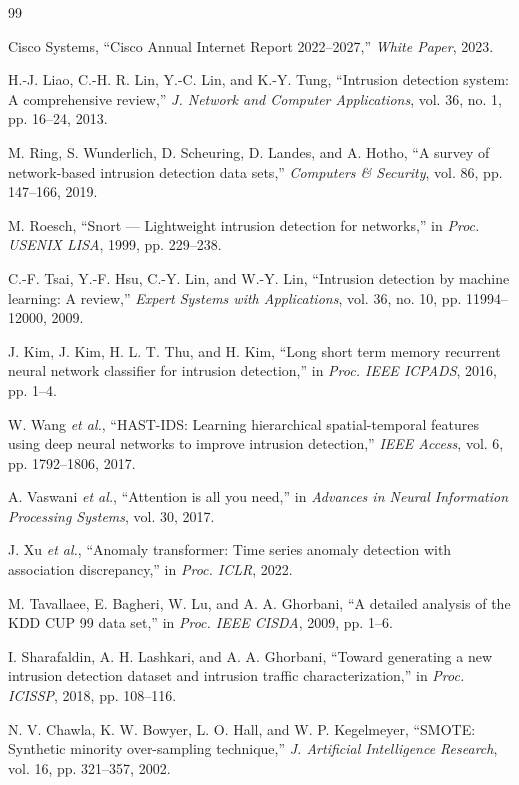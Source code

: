 \documentclass[conference]{IEEEtran}
\begin{document}
\begin{thebibliography}{99}

	Cisco Systems, ``Cisco Annual Internet Report 2022--2027,''
	\textit{White Paper}, 2023.

	H.-J. Liao, C.-H. R. Lin, Y.-C. Lin, and K.-Y. Tung,
	``Intrusion detection system: A comprehensive review,''
	\textit{J. Network and Computer Applications}, vol. 36, no. 1,
	pp. 16--24, 2013.

	M. Ring, S. Wunderlich, D. Scheuring, D. Landes, and A. Hotho,
	``A survey of network-based intrusion detection data sets,''
	\textit{Computers \& Security}, vol. 86, pp. 147--166, 2019.

	M. Roesch, ``Snort --- Lightweight intrusion detection for networks,''
	in \textit{Proc. USENIX LISA}, 1999, pp. 229--238.

	C.-F. Tsai, Y.-F. Hsu, C.-Y. Lin, and W.-Y. Lin,
	``Intrusion detection by machine learning: A review,''
	\textit{Expert Systems with Applications}, vol. 36, no. 10,
	pp. 11994--12000, 2009.

	J. Kim, J. Kim, H. L. T. Thu, and H. Kim,
	``Long short term memory recurrent neural network classifier for
	intrusion detection,''
	in \textit{Proc. IEEE ICPADS}, 2016, pp. 1--4.

	W. Wang \textit{et al.},
	``HAST-IDS: Learning hierarchical spatial-temporal features using
	deep neural networks to improve intrusion detection,''
	\textit{IEEE Access}, vol. 6, pp. 1792--1806, 2017.

	A. Vaswani \textit{et al.},
	``Attention is all you need,''
	in \textit{Advances in Neural Information Processing Systems},
	vol. 30, 2017.

	J. Xu \textit{et al.},
	``Anomaly transformer: Time series anomaly detection with
	association discrepancy,''
	in \textit{Proc. ICLR}, 2022.

	M. Tavallaee, E. Bagheri, W. Lu, and A. A. Ghorbani,
	``A detailed analysis of the KDD CUP 99 data set,''
	in \textit{Proc. IEEE CISDA}, 2009, pp. 1--6.

	I. Sharafaldin, A. H. Lashkari, and A. A. Ghorbani,
	``Toward generating a new intrusion detection dataset and intrusion
	traffic characterization,''
	in \textit{Proc. ICISSP}, 2018, pp. 108--116.

	N. V. Chawla, K. W. Bowyer, L. O. Hall, and W. P. Kegelmeyer,
	``SMOTE: Synthetic minority over-sampling technique,''
	\textit{J. Artificial Intelligence Research}, vol. 16,
	pp. 321--357, 2002.

\end{thebibliography}

\end{document}
